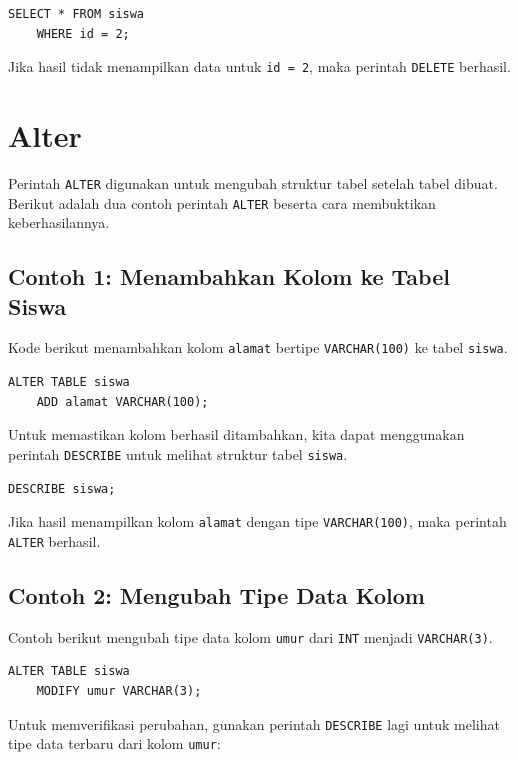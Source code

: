 \begin{lstlisting}[style=sql]
	SELECT * FROM siswa
	WHERE id = 2;
\end{lstlisting}

Jika hasil tidak menampilkan data untuk \texttt{id = 2}, maka perintah \texttt{DELETE} berhasil.

\section{Alter}

Perintah \texttt{ALTER} digunakan untuk mengubah struktur tabel setelah tabel dibuat. Berikut adalah dua contoh perintah \texttt{ALTER} beserta cara membuktikan keberhasilannya.

\subsection*{Contoh 1: Menambahkan Kolom ke Tabel Siswa}
Kode berikut menambahkan kolom \texttt{alamat} bertipe \texttt{VARCHAR(100)} ke tabel \texttt{siswa}.

\begin{lstlisting}[style=sql]
	ALTER TABLE siswa
	ADD alamat VARCHAR(100);
\end{lstlisting}

Untuk memastikan kolom berhasil ditambahkan, kita dapat menggunakan perintah \texttt{DESCRIBE} untuk melihat struktur tabel \texttt{siswa}.

\begin{lstlisting}[style=sql]
	DESCRIBE siswa;
\end{lstlisting}

Jika hasil menampilkan kolom \texttt{alamat} dengan tipe \texttt{VARCHAR(100)}, maka perintah \texttt{ALTER} berhasil.

\subsection*{Contoh 2: Mengubah Tipe Data Kolom}
Contoh berikut mengubah tipe data kolom \texttt{umur} dari \texttt{INT} menjadi \texttt{VARCHAR(3)}.

\begin{lstlisting}[style=sql]
	ALTER TABLE siswa
	MODIFY umur VARCHAR(3);
\end{lstlisting}

Untuk memverifikasi perubahan, gunakan perintah \texttt{DESCRIBE} lagi untuk melihat tipe data terbaru dari kolom \texttt{umur}:

